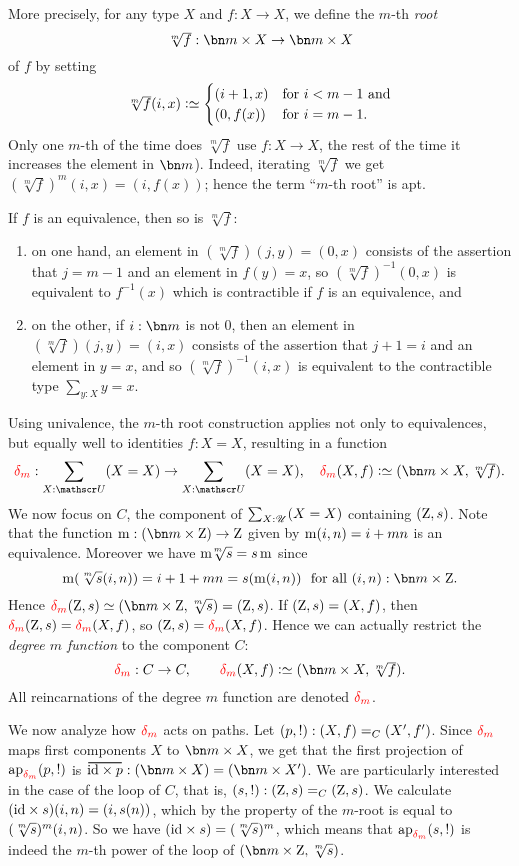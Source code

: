 \begin{example}
More precisely, for any type $X$ and $f:X\to X$, we define the $m$-th \emph{root}
\[
{\textstyle\sqrt[m]f} : {\bn m\times X} \to {\bn m\times X}
\]
of $f$ by setting 
\[
{\textstyle\sqrt[m]f}(i,x)\defeq
\begin{cases}
  (i+1,x)& \text{for $i<m-1$ and}\\
  (0,f(x))& \text{for $i=m-1$}.
\end{cases}
\] 
Only one $m$-th of the time does $\sqrt[m]f$ use $f:X\to X$,
the rest of the time it increases the element in $\bn m$).
Indeed, iterating $\sqrt[m]f$ we get $(\sqrt[m]f)^m(i,x)=(i,f(x))$; 
hence the term ``$m$-th root'' is apt.

If $f$ is an equivalence, then so is $\sqrt[m]f$:
\begin{enumerate}
\item on one hand, an element in  $(\sqrt[m]f)(j,y) = (0,x)$ consists 
of the assertion that  $j=m-1$ and an element in $f(y)=x$,
so  $(\sqrt[m]f)^{-1}(0,x)$ is equivalent 
to $f^{-1}(x)$ which is contractible if $f$ is an equivalence, and 
\item on the other, if $i:\bn m$ is not $0$, then 
 an element in $(\sqrt[m]f)(j,y)=(i,x)$
 consists of the assertion that $j+1=i$ and an element in   $y=x$, and so 
$(\sqrt[m]f)^{-1}(i,x)$ is equivalent to the contractible type $\sum_{y:X}y=x$.
\end{enumerate}

Using univalence, the $m$-th root construction applies not only to equivalences, 
but equally well to identities $f:X=X$, resulting in a function 
\[
\dg{m}:\sum_{X:\UU}(X=X)\to\sum_{X:\UU}(X=X),\quad \dg{m}(X,f)\defeq(\bn m\times X,{\textstyle\sqrt[m]f}).
\]
We now focus on  $C$, the component of $\sum_{X:{\mathscr{U}}}(X=X)$ containing $(\mathrm{Z},{s})$.
Note that the function $\mZ : (\bn m\times \zet) \to \zet$ 
given by $\mZ(i,n)=i+mn$ is an equivalence. 
Moreover we have ${\mZ\!\!\sqrt[\uproot{2}m]s} = {s\mZ}$ since
\[
\mZ(\sqrt[\uproot{2}m]s(i,n)) = i+1+mn = s(\mZ(i,n))
~~\text{for all $(i,n):\bn m\times \zet$}.
\]  
Hence $\dg{m}(\zet,\etop{s}) \jdeq (\bn m\times\zet,\sqrt[\uproot{2}m]{\etop{s}}) = (\zet,\etop{s})$.
If $(\mathrm{Z},{s})=(X,f)$, then $\dg{m}(\zet,\etop{s})=\dg{m}(X,f)$, 
so $(\zet,\etop{s})=\dg{m}(X,f)$. Hence we can actually restrict the
\emph{degree $m$ function} to the component $C$: 
\[
\dg{m}:C\to C,\qquad \dg{m}(X,f)\defeq(\bn m\times X,{\textstyle\sqrt[m]f}).%
\]
All reincarnations of the degree $m$ function are denoted $\dg{m}$.

We now analyze how $\dg{m}$ acts on paths. Let $({p},!):(X,f)=_C(X',f')$.
Since $\dg{m}$ maps first components $X$ to $\bn m\times X$, we get that
the first projection of $\ap{\dg{m}}(\etop{p},!)$ is 
$\overetop{\id\times p} : (\bn m\times X) = (\bn m\times X')$.
We are particularly interested in the case of the loop of $C$, 
that is, $({s},!):(\mathrm{Z},{s})=_C(\mathrm{Z},{s})$.
We calculate $(\mathord{\mathrm{id}}\times s)(i,n) = (i,s(n))$,
which by the property of the $m$-root is equal to $(\sqrt[\uproot{2}m]s)^m(i,n)$.
So we have $(\id\times s)=(\sqrt[\uproot{2}m]s)^m$, which means that
$\ap{\dg{m}}(\etop{s},!)$ is indeed the $m$-th power of the
loop of $(\bn m\times \zet,\sqrt[\uproot{2}m]{\etop{s}})$.


\end{example}
